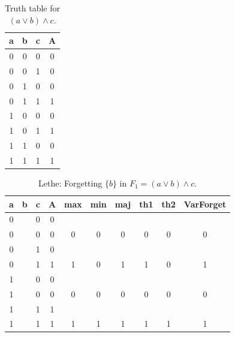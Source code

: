 \begin{table}[!tb]
    \centering
    \begin{tabular}{|c|c|c|c|}
        \hline
        \textbf{a} & \textbf{b} & \textbf{c} & \textbf{A} \\ \hline
        0 & 0 & 0 & 0 \\ \hline
        0 & 0 & 1 & 0 \\ \hline
        0 & 1 & 0 & 0 \\ \hline
        0 & 1 & 1 & 1 \\ \hline
        1 & 0 & 0 & 0 \\ \hline
        1 & 0 & 1 & 1 \\ \hline
        1 & 1 & 0 & 0 \\ \hline
        1 & 1 & 1 & 1 \\ \hline
    \end{tabular}
    \caption{Truth table for $(a \lor b) \land c$.}
    \label{tab:truthtab}
\end{table}

\begin{table}[!tb]
    \centering
    \begin{tabular}{|c|c|c|c|c|c|c|c|c|c|}
        \hline
        \textbf{a} & \textbf{b} & \textbf{c} & \textbf{A} & \textbf{max} & \textbf{min} & \textbf{maj} & \textbf{th1} & \textbf{th2} & \textbf{VarForget} \\ \hline
        \rowcolor{gray!40} 0 &  & 0 & 0 &  &  &  &  &  &  \\ \hline
        \rowcolor{gray!40} 0 &  & 0 & 0 & 0 & 0 & 0 & 0 & 0 & 0 \\ \hline
        \rowcolor{blue!40} 0 &  & 1 & 0 &  &  &  &  &  &  \\ \hline
        \rowcolor{blue!40} 0 &  & 1 & 1 & 1 & 0 & 1 & 1 & 0 & 1 \\ \hline
        \rowcolor{red!40} 1 &  & 0 & 0 &  &  &  &  &  &  \\ \hline
        \rowcolor{red!40} 1 &  & 0 & 0 & 0 & 0 & 0 & 0 & 0 & 0 \\ \hline
        \rowcolor{green!40} 1 &  & 1 & 1 &  &  &  &  &  &  \\ \hline
        \rowcolor{green!40} 1 &  & 1 & 1 & 1 & 1 & 1 & 1 & 1 & 1 \\ \hline
    \end{tabular}
    \caption{Lethe: Forgetting $\{b\}$ in $F_{1} = (a \lor b) \land c$.}
    \label{tab:lethe-F1-b}
\end{table}
